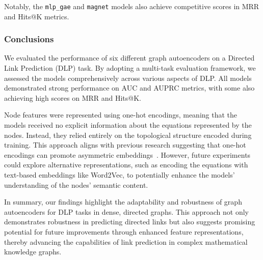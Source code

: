 Notably, the \texttt{mlp\_gae} and \texttt{magnet} models also achieve competitive scores in MRR and
Hits@K metrics.

\subsubsection{Conclusions}

We evaluated the performance of six different graph autoencoders on a Directed Link Prediction (DLP) task.
By adopting a multi-task evaluation framework, we assessed the models comprehensively across various
aspects of DLP. All models demonstrated strong performance on AUC and AUPRC metrics, with some also
achieving high scores on MRR and Hits@K.

Node features were represented using one-hot encodings, meaning that the models received no explicit
information about the equations represented by the nodes. Instead, they relied entirely on the
topological structure encoded during training. This approach aligns with previous research suggesting
that one-hot encodings can promote asymmetric embeddings~\cite{Salha2019}. However, future experiments
could explore alternative representations, such as encoding the equations with text-based embeddings
like Word2Vec, to potentially enhance the models' understanding of the nodes' semantic content.

In summary, our findings highlight the adaptability and robustness of graph autoencoders for DLP
tasks in dense, directed graphs. This approach not only demonstrates robustness in predicting directed
links but also suggests promising potential for future improvements through enhanced feature
representations, thereby advancing the capabilities of link prediction in complex mathematical
knowledge graphs.
